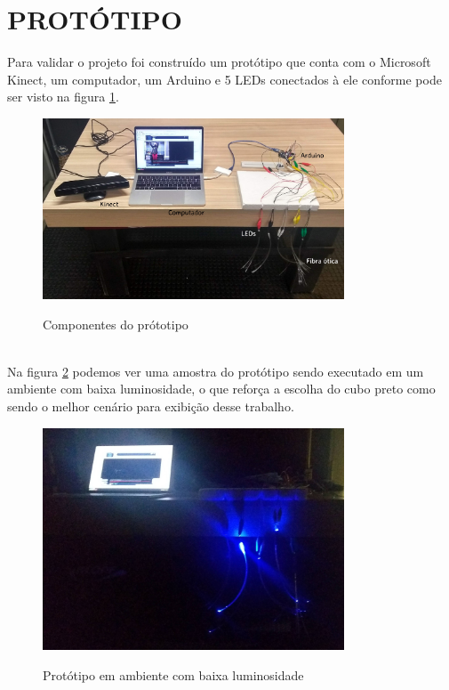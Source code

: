 \section{PROTÓTIPO}

Para validar o projeto foi construído um protótipo que conta com o Microsoft Kinect, um computador, um Arduino e 5 LEDs conectados à ele conforme pode ser visto na figura \ref{fig:prototipo}. 

\begin{figure}[H]
    \centering
    \caption{Componentes do prótotipo}
	\vspace*{0,2cm}
    \includegraphics[width=0.8\textwidth]{./04-figuras/prototipo}
    \label{fig:prototipo}
\end{figure}
\vspace*{-0,9cm}
{\raggedright {}}\\

Na figura \ref{fig:prototipo-escuro} podemos ver uma amostra do protótipo sendo executado em um ambiente com baixa luminosidade, o que reforça a escolha do cubo preto como sendo o melhor cenário para exibição desse trabalho.
 
\begin{figure}[H]
    \centering
    \caption{Protótipo em ambiente com baixa luminosidade}
	\vspace*{0,2cm}
    \includegraphics[width=0.8\textwidth]{./04-figuras/prototipo_escuro}
    \label{fig:prototipo-escuro}
\end{figure}
\vspace*{-0,9cm}
{\raggedright {}}\\

   

